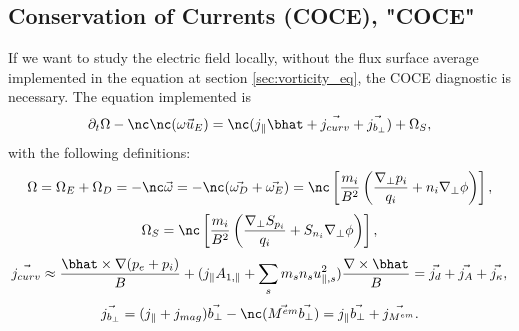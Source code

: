 \subsection{Conservation of Currents (COCE), "COCE"}\label{sec:COCE}
If we want to study the electric field locally, without the flux surface average implemented in the equation at section \ref{sec:vorticity_eq}, the COCE diagnostic is necessary. The equation implemented is 
\begin{equation}
    \partial_t\Omega-\nc\nc(\vec{\omega u_E})=\nc(j_\parallel\bhat+\vec{j_{curv}}+\vec{j_{b_\perp}})+\Omega_S,
    \label{eq:COCE_diagnostic}
\end{equation}   
with the following definitions:
\begin{equation}
\Omega=\Omega_E+\Omega_D=-\nc\vec{\omega}=-\nc(\vec{\omega_D}+\vec{\omega_E})=\nc\left[\frac{m_i}{B^2}\left(\frac{\nabla_\perp p_i}{q_i}+n_i\nabla_\perp\phi\right)\right],
\end{equation}
\begin{equation}
    \Omega_S=\nc\left[\frac{m_i}{B^2}\left(\frac{\nabla_\perp S_{p_i}}{q_i}+S_{n_i}\nabla_\perp\phi\right)\right],
\end{equation}
\begin{equation}
     \vec{j_{curv}}\approx\frac{\bhat\times\nabla(p_e+p_i)}{B}+(j_\parallel A_{1,\parallel}+\sum_s m_s n_s u_{\parallel,s}^2) \frac{\nabla\times\bhat}{B}=\vec{j_{d}}+\vec{j_A}+\vec{j_\kappa},
\end{equation}
\begin{equation}
      \vec{j_{b_\perp}}=(j_\parallel+j_{mag})\vec{b_\perp}-\nc(\vec{M^{em}}\vec{b_\perp})=j_\parallel\vec{b_\perp}+\vec{j_{M^{em}}}.
\end{equation}


